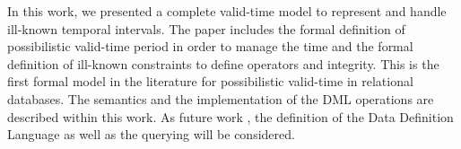 In this work, we presented a complete valid-time model to represent and handle ill-known temporal intervals. The paper includes the formal definition of possibilistic valid-time period in order to manage the time and the formal definition of ill-known constraints to define operators and integrity. This is the first formal model in the literature for possibilistic valid-time in relational databases. The semantics and the implementation of the DML operations are described within this work. As future work , the definition of the Data Definition Language as well as the querying will be considered.
